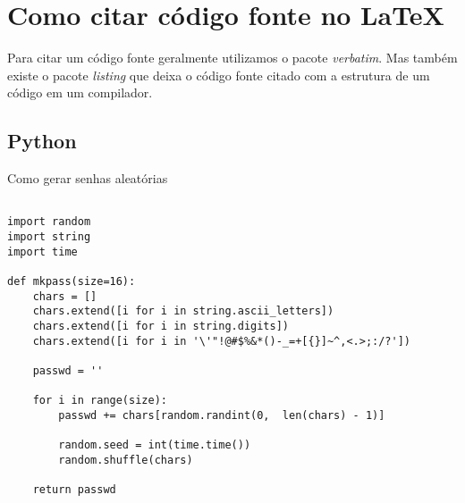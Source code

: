 \documentclass[a4paper]{article}
\begin{document}
    \section*{Como citar  código fonte no \LaTeX}
    Para citar um código fonte geralmente utilizamos o pacote \emph{verbatim}. Mas também existe o pacote                 \emph{listing} que deixa o código fonte citado com a estrutura de um código em um compilador.

        \subsection*{Python}
        Como gerar senhas aleatórias
            \begin{lstlisting}

import random
import string
import time

def mkpass(size=16):
    chars = []
    chars.extend([i for i in string.ascii_letters])
    chars.extend([i for i in string.digits])
    chars.extend([i for i in '\'"!@#$%&*()-_=+[{}]~^,<.>;:/?'])

    passwd = ''

    for i in range(size):
        passwd += chars[random.randint(0,  len(chars) - 1)]

        random.seed = int(time.time())
        random.shuffle(chars)

    return passwd

           \end{lstlisting}
\end{document}
